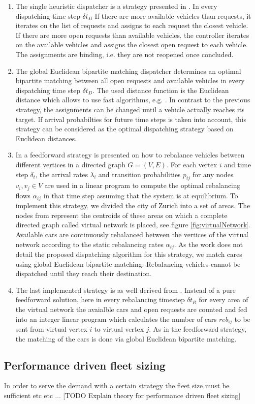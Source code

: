 \begin{enumerate}
\item The single heuristic dispatcher is a strategy presented in \cite{bischoff2016simulation}. In every dispatching time step $\delta t_D$ If there are more available vehicles than requests, it iterates on the list of requests and assigns to each request the closest vehicle. If there are more open requests than available vehicles, the controller iterates on the available vehicles and assigns the closest open request to each vehicle. The assignments are binding, i.e. they are not reopened once concluded.
\item The global Euclidean bipartite matching dispatcher determines an optimal bipartite matching between all open requests and available vehicles in every dispatching time step $\delta t_D$. The used distance function is the Euclidean distance which allows to use fast algorithms, e.g. \cite{agarwal2004near}. In contrast to the previous strategy, the assignments can be changed until a vehicle actually reaches its target. If arrival probabilties for future time steps is taken into account, this strategy can be considered as the optimal dispatching strategy based on Euclidean distances.
\item In \cite{pavone2011load} a feedforward strategy is presented on how to rebalance vehicles between different vertices in a directed graph $G = (V,E)$. For each vertex $i$ and time step $\delta_t$, the arrival rates $\lambda_i$ and transition probabilities $p_{ij}$ for any nodes $v_i, v_j \in V$  are used in a linear program to compute the optimal rebalancing flows $\alpha _{ij}$ in that time step assuming that the system is at equilibrium. To implement this strategy, we divided the city of Zurich into a set of areas. The nodes from \cite{pavone2011load} represent the centroids of these areas on which a complete directed graph called virtual network is placed, see figure \ref{fig:virtualNetwork}. Available cars are continuously rebalanced between the vertices of the virtual network according to the static rebalancing rates $\alpha_{ij}$. As the work does not detail the proposed dispatching algorithm for this strategy, we match cares using global Euclidean bipartite matching. Rebalancing vehicles cannot be dispatched until they reach their destination.
\item The last implemented strategy is as well derived from \cite{pavone2011load}. Instead of a pure feedforward solution, here in every rebalancing timestep $\delta t_R$ for every area of the virtual network the avaialble cars and open requests are counted and fed into an integer linear program which calculates the number of cars $reb _{ij}$ to be sent from virtual vertex $i$ to virtual vertex $j$. As in the feedforward strategy, the matching of the cars is done via global Euclidean bipartite matching.
\end{enumerate}

\subsection{Performance driven fleet sizing}

In order to serve the demand with a certain strategy the fleet size must be sufficient etc etc ... [TODO Explain theory for performance driven fleet sizing]
